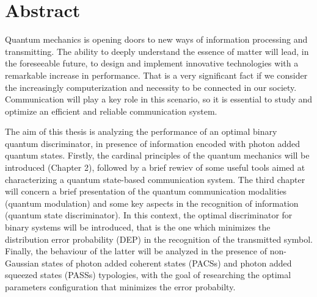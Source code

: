 
\chapter*{Abstract}
    Quantum mechanics is opening doors to new ways of information processing and transmitting.
    The ability to deeply understand the essence of matter will lead, in the foreseeable future, to design
    and implement innovative technologies with a remarkable increase in performance.
    That is a very significant fact if we consider the increasingly computerization and necessity to be
    connected in our society.
    Communication will play a key role in this scenario, so it is essential to study and optimize an
    efficient and reliable communication system.

    The aim of this thesis is analyzing the performance of an optimal binary quantum discriminator, in
    presence of information encoded with photon added quantum states.
    Firstly, the cardinal principles of the quantum mechanics will be introduced (Chapter 2), followed
    by a brief rewiev of some useful tools aimed at characterizing a quantum state-based
    communication system.
    The third chapter will concern a brief presentation of the quantum communication modalities
    (quantum modulation) and some key aspects in the recognition of information (quantum state
    discriminator). In this context, the optimal discriminator for binary systems will be introduced, that
    is the one which minimizes the distribution error probability (DEP) in the recognition of the
    transmitted symbol.
    Finally, the behaviour of the latter will be analyzed in the presence of non-Gaussian states of photon
    added coherent states (PACSs) and photon added squeezed states (PASSs) typologies, with the goal
    of researching the optimal parameters configuration that minimizes the error probabilty.